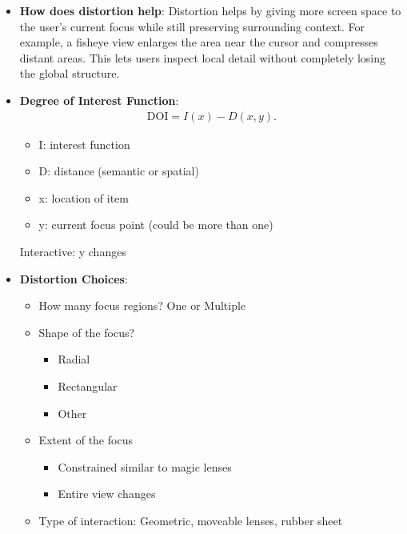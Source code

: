 \documentclass{report}
\begin{document}
\begin{itemize}
\begin{itemize}
            \end{itemize}
            \begin{itemize}
                \item Elision
                \item Superimposition: more directly tied than with layers
                \item Distortion
            \end{itemize}
        \item \textbf{How does distortion help}: Distortion helps by giving more screen space to the user’s current focus while still preserving surrounding context.
            \bigbreak \noindent 
            For example, a fisheye view enlarges the area near the cursor and compresses distant areas. This lets users inspect local detail without completely losing the global structure.
        \item \textbf{Degree of Interest Function}: 
            \begin{align*}
                \text{DOI} = I(x) - D(x,y)
            .\end{align*}
            \begin{itemize}
                \item I: interest function
                \item D: distance (semantic or spatial)
                \item x: location of item
                \item y: current focus point (could be more than one) 
            \end{itemize}
            Interactive: y changes
        \item \textbf{Distortion Choices}: 
            \begin{itemize}
                \item How many focus regions? One or Multiple
                \item Shape of the focus?
                    \begin{itemize}
                        \item Radial
                        \item Rectangular
                        \item Other
                    \end{itemize}
                \item Extent of the focus
                    \begin{itemize}
                        \item Constrained similar to magic lenses
                        \item Entire view changes
                    \end{itemize}
                \item Type of interaction: Geometric, moveable lenses, rubber sheet
            \end{itemize}
    \end{itemize}
\end{document}
